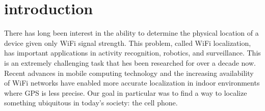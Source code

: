\section{introduction}

There has long been interest in the ability to determine the physical
location of a device given only WiFi signal strength. This problem,
called WiFi localization, has important applications in activity
recognition, robotics, and surveillance. This is an extremely
challenging task that hes been researched for over a decade now.
Recent advances in mobile computing technology and the increasing
availability of WiFi networks have enabled more accurate localization
in indoor environments where GPS is less precise. Our goal in particular
was to find a way to localize something ubiquitous in today's society: the 
cell phone.  
